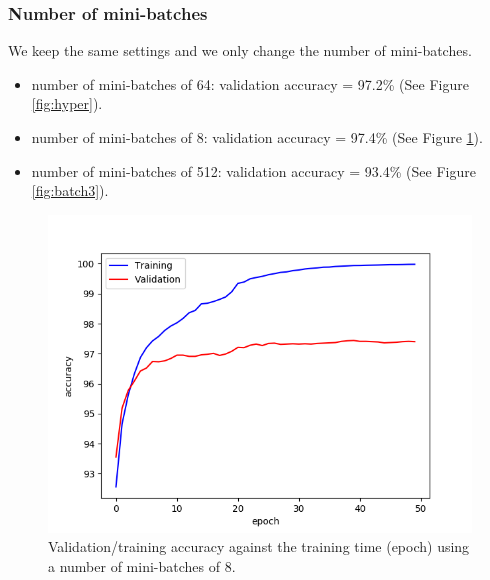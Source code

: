 \documentclass[a4paper]{article}
\begin{document}
\begin{enumerate}
\subsubsection{Number of mini-batches}
We keep the same settings and we only change the number of mini-batches.

\begin{itemize}

\item number of mini-batches of 64: validation accuracy = 97.2\% (See Figure \ref{fig:hyper}).

\item number of mini-batches of 8: validation accuracy = 97.4\% (See Figure \ref{fig:batch2}).

\item number of mini-batches of 512: validation accuracy = 93.4\% (See Figure \ref{fig:batch3}).  
  
\end{itemize}

\begin{figure}
\centering
\includegraphics[width=1\textwidth]{batch2.png}
\caption{\label{fig:batch2}Validation/training accuracy against the training time (epoch) using a number of mini-batches of 8.}
\end{figure}


\end{enumerate}
\end{document}
